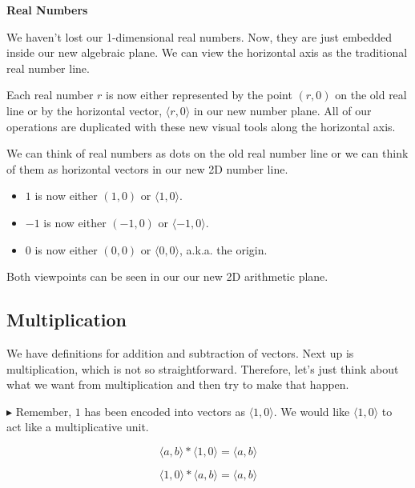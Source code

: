 \documentclass{ximera}
\begin{document}
\textbf{Real Numbers}



We haven't lost our 1-dimensional real numbers. Now, they are just embedded inside our new algebraic plane.  We can view the horizontal axis as the traditional real number line.

Each real number $r$ is now either represented by the point $(r,0)$ on the old real line or by the horizontal vector, $\langle r, 0 \rangle$ in our new number plane.  All of our operations are duplicated with these new visual tools along the horizontal axis.


We can think of real numbers as dots on the old real number line or we can think of them as horizontal vectors in our new 2D number line.


\begin{itemize}
\item $1$ is now either $(1,0)$ or $\langle 1, 0 \rangle$.
\item $-1$ is now either $(-1,0)$ or $\langle -1, 0 \rangle$.
\item $0$ is now either $(0,0)$ or $\langle 0, 0 \rangle$, a.k.a. the origin.
\end{itemize}

Both viewpoints can be seen in our our new 2D arithmetic plane.












\subsection*{Multiplication}



We have definitions for addition and subtraction of vectors.  Next up is multiplication, which is not so straightforward.  Therefore, let's just think about what we want from multiplication and then try to make that happen.

\textbf{\textcolor{red!70!darkgray}{$\blacktriangleright$}} Remember, $1$ has been encoded into vectors as $\langle 1, 0 \rangle$.  We would like $\langle 1, 0 \rangle$ to act like a multiplicative unit.

\[    \langle a, b \rangle * \langle 1, 0 \rangle    = \langle a, b \rangle            \]

\[    \langle 1, 0 \rangle * \langle a, b \rangle    = \langle a, b \rangle            \]
\end{document}
